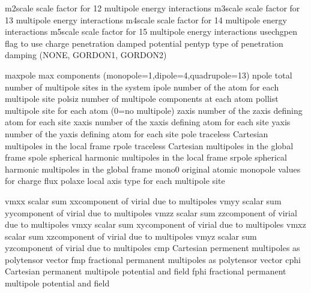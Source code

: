 \documentclass[letterpaper,11pt,english]{sphinxmanual}
\begin{document}

\begin{sphinxVerbatim}[commandchars=\\\{\}]
m2scale         scale factor for 1\PYGZhy{}2 multipole energy interactions
m3scale         scale factor for 1\PYGZhy{}3 multipole energy interactions
m4scale         scale factor for 1\PYGZhy{}4 multipole energy interactions
m5scale         scale factor for 1\PYGZhy{}5 multipole energy interactions
use\PYGZus{}chgpen      flag to use charge penetration damped potential
pentyp          type of penetration damping (NONE, GORDON1, GORDON2)
\end{sphinxVerbatim}


\begin{sphinxVerbatim}[commandchars=\\\{\}]
maxpole         max components (monopole=1,dipole=4,quadrupole=13)
npole           total number of multipole sites in the system
ipole           number of the atom for each multipole site
polsiz          number of multipole components at each atom
pollist         multipole site for each atom (0=no multipole)
zaxis           number of the z\PYGZhy{}axis defining atom for each site
xaxis           number of the x\PYGZhy{}axis defining atom for each site
yaxis           number of the y\PYGZhy{}axis defining atom for each site
pole            traceless Cartesian multipoles in the local frame
rpole           traceless Cartesian multipoles in the global frame
spole           spherical harmonic multipoles in the local frame
srpole          spherical harmonic multipoles in the global frame
mono0           original atomic monopole values for charge flux
polaxe          local axis type for each multipole site
\end{sphinxVerbatim}


\begin{sphinxVerbatim}[commandchars=\\\{\}]
vmxx            scalar sum xx\PYGZhy{}component of virial due to multipoles
vmyy            scalar sum yy\PYGZhy{}component of virial due to multipoles
vmzz            scalar sum zz\PYGZhy{}component of virial due to multipoles
vmxy            scalar sum xy\PYGZhy{}component of virial due to multipoles
vmxz            scalar sum xz\PYGZhy{}component of virial due to multipoles
vmyz            scalar sum yz\PYGZhy{}component of virial due to multipoles
cmp             Cartesian permenent multipoles as polytensor vector
fmp             fractional permanent multipoles as polytensor vector
cphi            Cartesian permanent multipole potential and field
fphi            fractional permanent multipole potential and field
\end{sphinxVerbatim}
\end{document}
